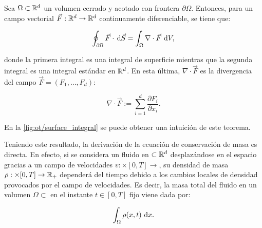 \begin{teo}
	\label{teo:gauss}
	Sea $\Omega\subset\mathbb{R}^d$ un volumen cerrado y acotado con frontera $\partial\Omega$. Entonces, para un campo vectorial $\vec{F}:\mathbb{R}^d\to\mathbb{R}^d$ continuamente diferenciable, se tiene que:

	\begin{equation*}
		\oint_{\partial\Omega} \vec{F} \cdot \,\operatorname{d}\! \vec{S}
		= \int_\Omega \nabla\cdot \vec{F} \,\operatorname{d}\! V ,
	\end{equation*}
	
	donde la primera integral es una integral de superficie mientras que la segunda integral es una integral estándar en $\mathbb{R}^d$. En esta última, $\nabla\cdot \vec{F}$ es la divergencia del campo $\vec{F} = (F_1,\ldots,F_d)$:

	\begin{equation*}
		\nabla\cdot \vec{F} := \sum_{i=1}^d \frac{\partial F_i}{\partial x_i} .
	\end{equation*}

\end{teo}

En la \autoref{fig:ot/surface_integral} se puede obtener una intuición de este teorema.


Teniendo este resultado, la derivación de la ecuación de conservación de masa es directa. En efecto, si se considera un fluido en $\subset\mathbb{R}^d$ desplazándose en el espacio gracias a un campo de velocidades $v:\xspace\times[0,T]\to\xspace$, su densidad de masa $\rho:\times[0,T]\to\mathbb{R}_+$ dependerá del tiempo debido a los cambios locales de densidad provocados por el campo de velocidades. Es decir, la masa total del fluido en un volumen $\Omega\subset\xspace$ en el instante $t\in[0,T]$ fijo viene dada por:

\begin{equation*}
	\int_\Omega \rho(x,t) \,\operatorname{d}\! x .
\end{equation*}

